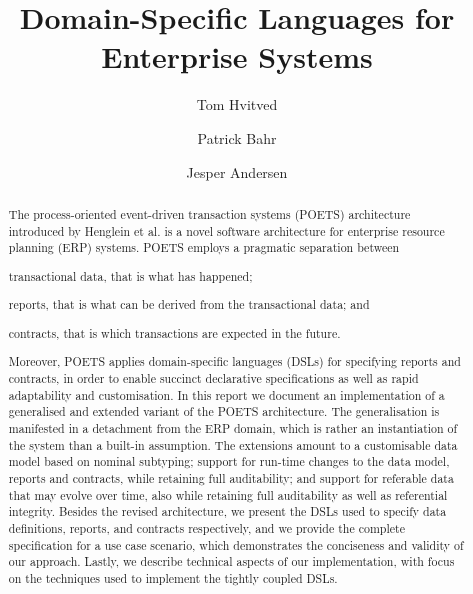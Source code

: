 \documentclass[10pt,draft]{article}
\begin{document}
\title{Domain-Specific Languages for Enterprise Systems}
\author{Tom Hvitved \and Patrick Bahr \and Jesper Andersen}

\renewcommand{\today}{\small Department of Computer Science, University of
    Copenhagen\\ Universitetsparken 1, 2100 Copenhagen, Denmark\\
  \{\texttt{hvitved,bahr,jespera}\}\texttt{@diku.dk}}

\maketitle

\begin{abstract}
  The process-oriented event-driven transaction systems (POETS)
  architecture introduced by Henglein et al. is a novel software architecture for
  enterprise resource planning (ERP) systems. POETS employs a pragmatic
  separation between
  \begin{inparaenum}[(i)]
  \item transactional data, that is what has happened;
  \item reports, that is what can be derived from the transactional
    data; and
  \item contracts, that is which transactions are expected in the
    future.
  \end{inparaenum}
  Moreover, POETS applies domain-specific languages (DSLs) for
  specifying reports and contracts, in order to enable succinct
  declarative specifications as well as rapid adaptability and
  customisation. In this report we document an implementation of a
  generalised and extended variant of the POETS architecture. The
  generalisation is manifested in a detachment from the ERP domain,
  which is rather an instantiation of the system than a built-in
  assumption. The extensions amount to a customisable data model based
  on nominal subtyping; support for run-time changes to the data
  model, reports and contracts, while retaining full
  auditability; and support for referable data that may evolve over
  time, also while retaining full auditability as well as referential
  integrity. Besides the revised architecture, we present the DSLs
  used to specify data definitions, 
  reports, and contracts respectively, and we provide the complete
  specification for a use case scenario, which demonstrates the
  conciseness and validity of our approach. Lastly, we describe
  technical aspects of our implementation, with focus on the techniques
  used to implement the tightly coupled DSLs.
\end{abstract}
\end{document}

